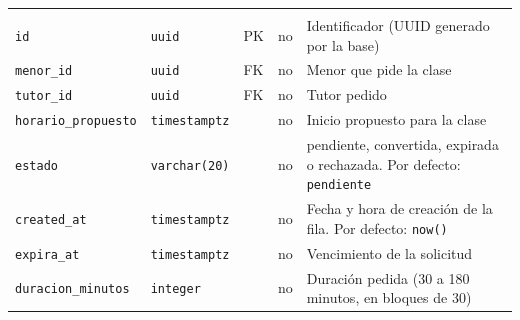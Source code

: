 {\small
\begin{xltabular}{\textwidth}{@{}>{\raggedright\arraybackslash}p{3.6cm} >{\raggedright\arraybackslash}p{2.3cm} >{\raggedright\arraybackslash}p{1cm} >{\centering\arraybackslash}p{0.85cm} L@{}}
    \toprule
     &  &  &  &  \\
    \midrule
    \endfirsthead
    \toprule
     &  &  &  &  \\
    \midrule
    \endhead
    \bottomrule
    \endfoot
    \texttt{id} & \texttt{uuid} & PK & no & Identificador (UUID generado por la base) \\
    \texttt{menor\_\allowbreak{}id} & \texttt{uuid} & FK & no & Menor que pide la clase \\
    \texttt{tutor\_\allowbreak{}id} & \texttt{uuid} & FK & no & Tutor pedido \\
    \texttt{horario\_\allowbreak{}propuesto} & \texttt{timestamptz} &  & no & Inicio propuesto para la clase \\
    \texttt{estado} & \texttt{varchar(\allowbreak{}20)} &  & no & pendiente, convertida, expirada o rechazada. Por defecto: \texttt{\textquotesingle{}pendiente\textquotesingle{}} \\
    \texttt{created\_\allowbreak{}at} & \texttt{timestamptz} &  & no & Fecha y hora de creación de la fila. Por defecto: \texttt{now(\allowbreak{})} \\
    \texttt{expira\_\allowbreak{}at} & \texttt{timestamptz} &  & no & Vencimiento de la solicitud \\
    \texttt{duracion\_\allowbreak{}minutos} & \texttt{integer} &  & no & Duración pedida (30 a 180 minutos, en bloques de 30) \\
\end{xltabular}
}

